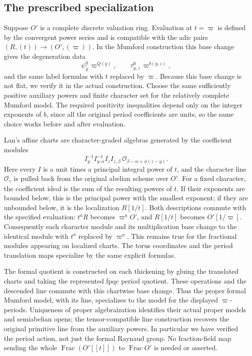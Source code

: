 \subsection*{The prescribed specialization}

Suppose $O'$ is a complete discrete valuation ring.  Evaluation
at $t=\varpi$ is defined by the convergent power series and is
compatible with the adic pairs $(R,(t))\to(O',(\varpi))$.
In the Mumford construction this base change gives the
degeneration data
\[
                  \psi^0_y\,\varpi^{Q(y)},
                  \qquad \tau^0_{y,z}\,\varpi^{b(y,z)},
\]
and the same label formulas with $t$ replaced by $\varpi$.
Because this base change is not flat, we verify it in the
actual construction.  Choose the same sufficiently positive
auxiliary powers and finite character set for the relatively
complete Mumford model.  The required positivity inequalities
depend only on the integer exponents of $b$, since all the
original period coefficients are units, so the same choice
works before and after evaluation.

Lan's affine charts are character-graded algebras generated by
the coefficient modules
\[
 I_y^{-1}I_{y,\alpha}^{-1}I_zI_{z,\beta}\,
       \mathcal O_{\beta-\alpha+\phi(z-y)}.
\]
Here every $I$ is a unit times a principal integral power of
$t$, and the character line $\mathcal O_\gamma$ is pulled
back from the original abelian scheme over $O'$.
For a fixed character, the coefficient ideal is the sum of
the resulting powers of $t$.  If their exponents are bounded
below, this is the principal power with the smallest exponent;
if they are unbounded below, it is the localization $R[1/t]$.
Both descriptions commute with the specified evaluation:
$t^aR$ becomes $\varpi^aO'$, and $R[1/t]$ becomes $O'[1/\varpi]$.
Consequently each character module and its multiplication
base change to the identical module with $t^a$ replaced by
$\varpi^a$.  This remains true for the fractional modules
appearing on localized charts.  The torus coordinates and
the period translation maps specialize by the same explicit
formulas\cite[Corollary 4.5.1.8 and the following affine-chart
formula]{formal-arcs-lan}.

The formal quotient is constructed on each thickening by
gluing the translated charts and taking the represented
fpqc period quotient.  These operations and the descended
line commute with this chartwise base change.  Thus the
proper formal Mumford model, with its line, specializes to
the model for the displayed $\varpi$-periods.
Uniqueness of proper algebraization identifies their actual
proper models and semiabelian opens; the tensor-compatible
line construction recovers the original primitive line
from the auxiliary powers\cite[Proposition 4.5.2.15 and
Theorem 4.4.16]{formal-arcs-lan}.
In particular we have verified the period action, not just
the formal Raynaud group.  No fraction-field map sending the whole
$\operatorname{Frac}(O'[[t]])$ to $\operatorname{Frac}O'$
is needed or asserted.

